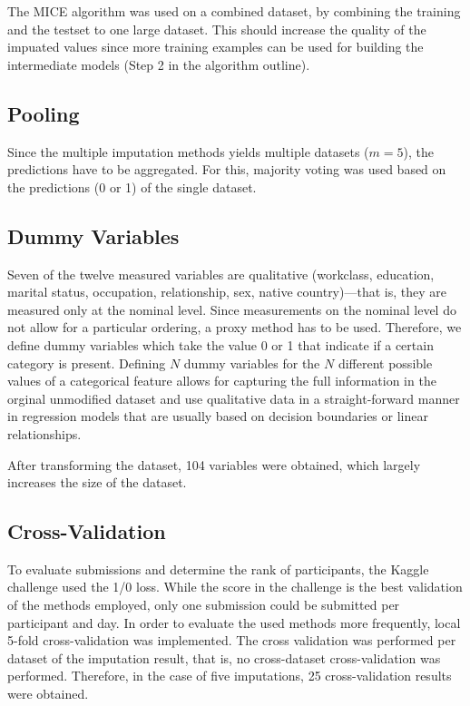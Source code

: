 \documentclass{article}
\begin{document}
The MICE algorithm was used on a combined dataset, by combining the
training and the testset to one large dataset. This should increase
the quality of the impuated values since more training examples can be
used for building the intermediate models (Step 2 in the algorithm
outline).

\subsection{Pooling}

Since the multiple imputation methods yields multiple datasets ($m =
5$), the predictions have to be aggregated. For this, majority voting
was used based on the predictions (0 or 1) of the single dataset.

\subsection{Dummy Variables}

Seven of the twelve measured variables are qualitative (workclass,
education, marital status, occupation, relationship, sex, native
country)---that is, they are measured only at the nominal level. Since
measurements on the nominal level do not allow for a particular
ordering, a proxy method has to be used. Therefore, we define dummy
variables which take the value 0 or 1 that indicate if a certain
category is present. Defining $N$ dummy variables for the $N$
different possible values of a categorical feature allows for
capturing the full information in the orginal unmodified dataset and
use qualitative data in a straight-forward manner in regression models
that are usually based on decision boundaries or linear relationships.

After transforming the dataset, 104 variables were obtained, which
largely increases the size of the dataset.

\subsection{Cross-Validation}
\label{sec:cross}

To evaluate submissions and determine the rank of participants, the
Kaggle challenge used the 1/0 loss. While the score in the challenge
is the best validation of the methods employed, only one submission
could be submitted per participant and day. In order to evaluate the
used methods more frequently, local 5-fold cross-validation was
implemented. The cross validation was performed per dataset of the
imputation result, that is, no cross-dataset cross-validation was
performed. Therefore, in the case of five imputations, 25
cross-validation results were obtained. 
\end{document}
